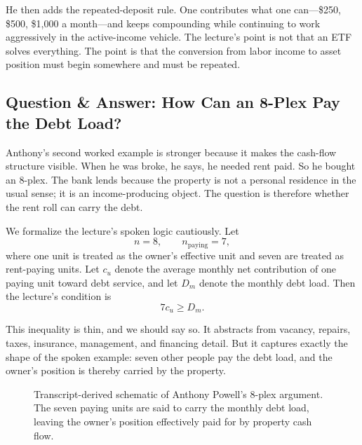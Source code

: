 He then adds the repeated-deposit rule. One contributes what one can---\$250, \$500, \$1{,}000 a month---and keeps compounding while continuing to work aggressively in the active-income vehicle. The lecture's point is not that an ETF solves everything. The point is that the conversion from labor income to asset position must begin somewhere and must be repeated.

\subsection{Question \& Answer: How Can an 8-Plex Pay the Debt Load?}

Anthony's second worked example is stronger because it makes the cash-flow structure visible. When he was broke, he says, he needed rent paid. So he bought an 8-plex. The bank lends because the property is not a personal residence in the usual sense; it is an income-producing object. The question is therefore whether the rent roll can carry the debt.

We formalize the lecture's spoken logic cautiously. Let
\begin{equation}
n=8,\qquad n_{\mathrm{paying}}=7,
\end{equation}
where one unit is treated as the owner's effective unit and seven are treated as rent-paying units. Let \(c_u\) denote the average monthly net contribution of one paying unit toward debt service, and let \(D_m\) denote the monthly debt load. Then the lecture's condition is
\begin{equation}
7c_u \ge D_m.
\end{equation}

This inequality is thin, and we should say so. It abstracts from vacancy, repairs, taxes, insurance, management, and financing detail. But it captures exactly the shape of the spoken example: seven other people pay the debt load, and the owner's position is thereby carried by the property.

\begin{figure}[h]
\centering
{}
\caption{Transcript-derived schematic of Anthony Powell's 8-plex argument. The seven paying units are said to carry the monthly debt load, leaving the owner's position effectively paid for by property cash flow.}
\end{figure}

